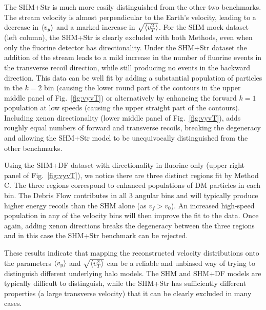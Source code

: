 The SHM+Str is much more easily distinguished from the other two benchmarks. The stream velocity is almost perpendicular to the Earth's velocity, leading to a decrease in $\langle v_y \rangle$ and a marked increase in $\sqrt{\langle v_T^2 \rangle}$. For the SHM mock dataset (left column), the SHM+Str is clearly excluded with both Methods, even when only the fluorine detector has directionality. Under the SHM+Str dataset the addition of the stream leads to a mild increase in the number of fluorine events in the transverse recoil direction, while still producing no events in the backward direction. This data can be well fit by adding a substantial population of particles in the $k=2$ bin (causing the lower round part of the contours in the upper middle panel of Fig.~\ref{fig:vyvT}) or alternatively by enhancing the forward $k=1$ population at low speeds (causing the upper straight part of the contours). Including xenon directionality (lower middle panel of Fig.~\ref{fig:vyvT}), adds roughly equal numbers of forward and transverse recoils, breaking the degeneracy and allowing the SHM+Str model to be unequivocally distinguished from the other benchmarks.

Using the SHM+DF dataset  with directionality in fluorine only (upper right panel of Fig.~\ref{fig:vyvT}), we notice there are three distinct regions fit by Method C. The three regions correspond to enhanced populations of DM particles in each bin. The Debris Flow contributes in all 3 angular bins and will typically produce higher energy recoils than the SHM alone (as $v_f > v_0$). An increased high-speed population in any of the velocity bins will then improve the fit to the data. Once again, adding xenon directions breaks the degeneracy between the three regions and in this case the SHM+Str benchmark can be rejected.

These results indicate that mapping the reconstructed velocity distributions onto the parameters $\langle v_y \rangle$ and $\sqrt{\langle v_T^2 \rangle}$ can be a reliable and unbiased way of trying to distinguish different underlying halo models. The SHM and SHM+DF models are typically difficult to distinguish, while the SHM+Str has sufficiently different properties (a large transverse velocity) that it can be clearly excluded in many cases.

